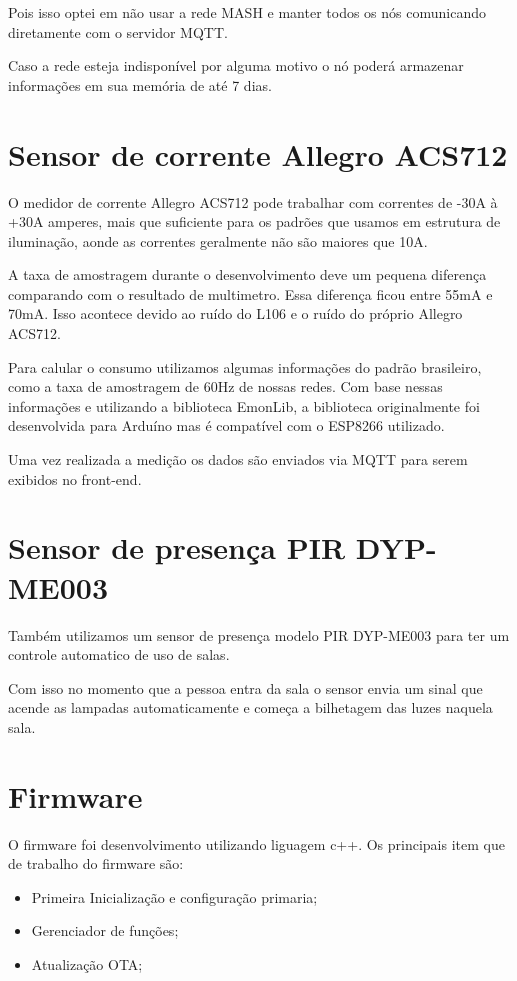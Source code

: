 \documentclass[openright]{normas-utf-tex} %
\begin{document}
Pois isso optei em não usar a rede MASH e manter todos os nós comunicando diretamente com o servidor MQTT.

Caso a rede esteja indisponível por alguma motivo o nó poderá armazenar informações em sua memória de até 7 dias.

\section{Sensor de corrente Allegro ACS712}
O medidor de corrente Allegro ACS712  \cite{Allegro} pode trabalhar com correntes de -30A à +30A   \cite{Allegro} amperes, mais que suficiente para os padrões que usamos em estrutura de iluminação, aonde as correntes geralmente não são maiores que 10A.

A taxa de amostragem durante o desenvolvimento deve um pequena diferença comparando com o resultado de multimetro. Essa diferença ficou entre 55mA e 70mA. Isso acontece devido ao ruído do L106 e o ruído do próprio Allegro ACS712.

Para calular o consumo utilizamos algumas informações do padrão brasileiro, como a taxa de amostragem de 60Hz de nossas redes. Com base nessas informações e utilizando a biblioteca EmonLib, a biblioteca originalmente foi desenvolvida para Arduíno mas é compatível com o ESP8266 utilizado.

Uma vez realizada a medição os dados são enviados via MQTT   \cite{Novatec}para serem exibidos no front-end.

\section{Sensor de presença PIR DYP-ME003}

Também utilizamos um sensor de presença modelo PIR DYP-ME003   \cite{openimpulse}
para ter um controle automatico de uso de salas. 

Com isso no momento que a pessoa entra da sala o sensor envia um sinal que acende as lampadas automaticamente e começa a bilhetagem das luzes naquela sala.


\section{Firmware}

O firmware foi desenvolvimento utilizando liguagem c++. Os principais item que de trabalho do firmware são:

\begin{itemize}
    \item Primeira Inicialização e configuração primaria;
    \item Gerenciador de funções;
    \item Atualização OTA;
\end{itemize}
\end{document}
